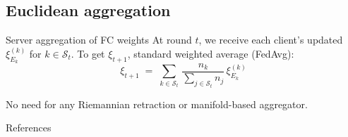 \documentclass[aspectratio=169,xcolor=dvipsnames]{beamer}
\begin{document}
\subsection{Euclidean aggregation}


\begin{frame}{Server aggregation of FC weights}
At round $t$, we receive each client’s updated $\xi_{E_k}^{(k)}$ for $k \in \mathcal{S}_t$.  
To get $\xi_{t+1}$,  standard weighted average (FedAvg):
\[
   \xi_{t+1}
   \;=\; \sum_{k\in \mathcal{S}_t} \, \frac{n_k}{\sum_{j\in \mathcal{S}_t}n_j}\,\xi_{E_k}^{(k)}
\]

\vspace{.5em}

No need for any Riemannian retraction or manifold-based aggregator.  
\end{frame}

\begin{frame}{References}
\tiny


\end{frame}
\end{document}
